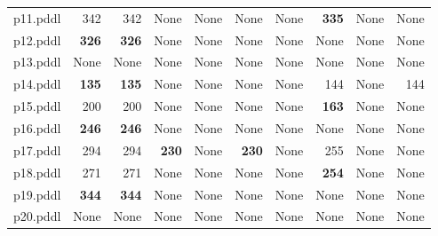 \documentclass{article}
\begin{document}
\begin{tabular}{@{}lrrrrrrrrr@{}}
p11.pddl & 342 & 342 & \multicolumn{1}{|l|}{None} & \multicolumn{1}{|l|}{None} & \multicolumn{1}{|l|}{None} & \multicolumn{1}{|l|}{None} & \textbf{335} & \multicolumn{1}{|l|}{None} & \multicolumn{1}{|l|}{None} \\
p12.pddl & \textbf{326} & \textbf{326} & \multicolumn{1}{|l|}{None} & \multicolumn{1}{|l|}{None} & \multicolumn{1}{|l|}{None} & \multicolumn{1}{|l|}{None} & \multicolumn{1}{|l|}{None} & \multicolumn{1}{|l|}{None} & \multicolumn{1}{|l|}{None} \\
p13.pddl & \multicolumn{1}{|l|}{None} & \multicolumn{1}{|l|}{None} & \multicolumn{1}{|l|}{None} & \multicolumn{1}{|l|}{None} & \multicolumn{1}{|l|}{None} & \multicolumn{1}{|l|}{None} & \multicolumn{1}{|l|}{None} & \multicolumn{1}{|l|}{None} & \multicolumn{1}{|l|}{None} \\
p14.pddl & \textbf{135} & \textbf{135} & \multicolumn{1}{|l|}{None} & \multicolumn{1}{|l|}{None} & \multicolumn{1}{|l|}{None} & \multicolumn{1}{|l|}{None} & 144 & \multicolumn{1}{|l|}{None} & 144 \\
p15.pddl & 200 & 200 & \multicolumn{1}{|l|}{None} & \multicolumn{1}{|l|}{None} & \multicolumn{1}{|l|}{None} & \multicolumn{1}{|l|}{None} & \textbf{163} & \multicolumn{1}{|l|}{None} & \multicolumn{1}{|l|}{None} \\
p16.pddl & \textbf{246} & \textbf{246} & \multicolumn{1}{|l|}{None} & \multicolumn{1}{|l|}{None} & \multicolumn{1}{|l|}{None} & \multicolumn{1}{|l|}{None} & \multicolumn{1}{|l|}{None} & \multicolumn{1}{|l|}{None} & \multicolumn{1}{|l|}{None} \\
p17.pddl & 294 & 294 & \textbf{230} & \multicolumn{1}{|l|}{None} & \textbf{230} & \multicolumn{1}{|l|}{None} & 255 & \multicolumn{1}{|l|}{None} & \multicolumn{1}{|l|}{None} \\
p18.pddl & 271 & 271 & \multicolumn{1}{|l|}{None} & \multicolumn{1}{|l|}{None} & \multicolumn{1}{|l|}{None} & \multicolumn{1}{|l|}{None} & \textbf{254} & \multicolumn{1}{|l|}{None} & \multicolumn{1}{|l|}{None} \\
p19.pddl & \textbf{344} & \textbf{344} & \multicolumn{1}{|l|}{None} & \multicolumn{1}{|l|}{None} & \multicolumn{1}{|l|}{None} & \multicolumn{1}{|l|}{None} & \multicolumn{1}{|l|}{None} & \multicolumn{1}{|l|}{None} & \multicolumn{1}{|l|}{None} \\
p20.pddl & \multicolumn{1}{|l|}{None} & \multicolumn{1}{|l|}{None} & \multicolumn{1}{|l|}{None} & \multicolumn{1}{|l|}{None} & \multicolumn{1}{|l|}{None} & \multicolumn{1}{|l|}{None} & \multicolumn{1}{|l|}{None} & \multicolumn{1}{|l|}{None} & \multicolumn{1}{|l|}{None} \\
\end{tabular}
\end{document}
